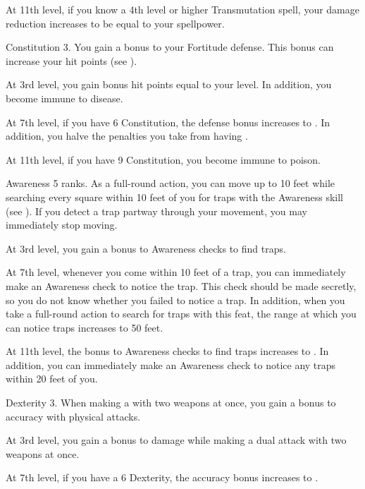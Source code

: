     At 11th level, if you know a 4th level or higher Transmutation spell, your damage reduction increases to be equal to your spellpower.

    \featpre Constitution 3.
    \featben You gain a  bonus to your Fortitude defense.
    This bonus can increase your hit points (see ).

    At 3rd level, you gain bonus hit points equal to your level.
    In addition, you become immune to disease.

    At 7th level, if you have 6 Constitution, the defense bonus increases to .
    In addition, you halve the penalties you take from having .

    At 11th level, if you have 9 Constitution, you become immune to poison.

    \featpre Awareness 5 ranks.
    \featben As a full-round action, you can move up to 10 feet while searching every square within 10 feet of you for traps with the Awareness skill (see ).
    If you detect a trap partway through your movement, you may immediately stop moving.

    At 3rd level, you gain a  bonus to Awareness checks to find traps.

    At 7th level, whenever you come within 10 feet of a trap, you can immediately make an Awareness check to notice the trap.
    This check should be made secretly, so you do not know whether you failed to notice a trap.
    In addition, when you take a full-round action to search for traps with this feat, the range at which you can notice traps increases to 50 feet.

    At 11th level, the bonus to Awareness checks to find traps increases to .
    In addition, you can immediately make an Awareness check to notice any traps within 20 feet of you.

    \featpre Dexterity 3.
    \featben When making a  with two weapons at once, you gain a  bonus to accuracy with physical attacks.

    At 3rd level, you gain a  bonus to damage while making a dual attack with two weapons at once.

    At 7th level, if you have a 6 Dexterity, the accuracy bonus increases to .

